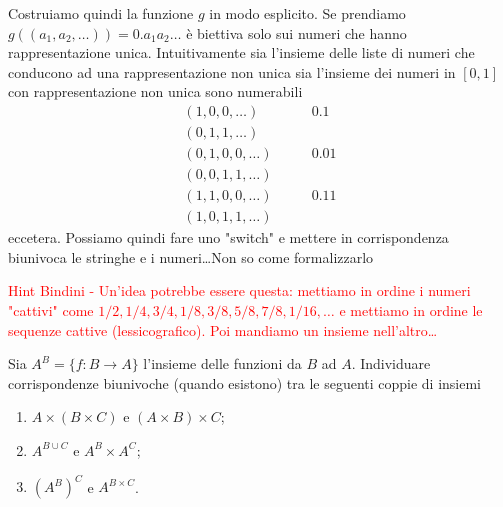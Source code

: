 \documentclass[a4paper]{article}\par \usepackage{style}\par
\begin{document}
\textsf{Costruiamo quindi la funzione $ g $ in modo esplicito. Se prendiamo $ g((a_1, a_2, \dots)) = 0.a_1 a_2 \dots $ è biettiva solo sui numeri che hanno rappresentazione unica. Intuitivamente sia l'insieme delle liste di numeri che conducono ad una rappresentazione non unica sia l'insieme dei numeri in $ [0, 1] $ con rappresentazione non unica sono numerabili
  \begin{align*}
    (1, 0, 0, \dots) & \qquad 0.1 \\
    (0, 1, 1, \dots) & \\
    (0, 1, 0, 0, \dots) & \qquad 0.01 \\
    (0, 0, 1, 1, \dots) & \\
    (1, 1, 0, 0, \dots) & \qquad 0.11 \\
    (1, 0, 1, 1, \dots) &
  \end{align*}
  eccetera. Possiamo quindi fare uno "switch" e mettere in corrispondenza biunivoca le stringhe e i numeri\ldots Non so come formalizzarlo}\\\par \textcolor{red}{Hint Bindini - Un'idea potrebbe essere questa: mettiamo in ordine i numeri "cattivi" come $ 1/2, 1/4, 3/4, 1/8, 3/8, 5/8, 7/8, 1/16, \ldots $ e mettiamo in ordine le sequenze cattive (lessicografico). Poi mandiamo un insieme nell'altro\ldots}\par \begin{es}
  Sia $ A^B = \{f \colon B \to A\} $ l'insieme delle funzioni da $ B $ ad $ A $. Individuare corrispondenze biunivoche (quando esistono) tra le seguenti coppie di insiemi
  \begin{enumerate}
  \item $ A \times (B \times C) $ e $ (A \times B) \times C $;
  \item $ A^{B \cup C} $ e $ A^B \times A^C $;
  \item $ (A^B)^C $ e $ A^{B \times C} $.
  \end{enumerate}
\end{es}
\end{document}
